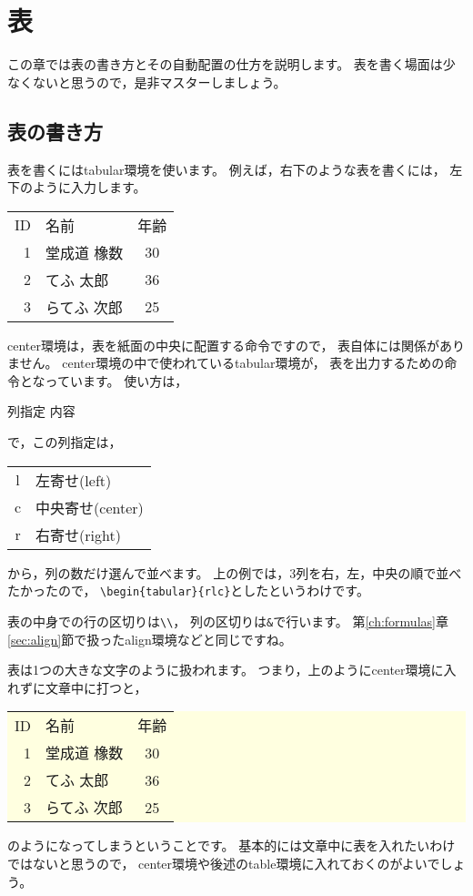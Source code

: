 \documentclass[class=jreport, crop=false, preview=false, dvipdfmx, fleqn]{standalone}
\begin{document}
\chapter{表}
\label{ch:tables}

この章では表の書き方とその自動配置の仕方を説明します。
表を書く場面は少なくないと思うので，是非マスターしましょう。



\section{表の書き方}
表を書くにはtabular環境を使います。
例えば，右下のような表を書くには，
左下のように入力します。

\begin{IOTeX}
\begin{center}
\begin{tabular}{rlc}
ID & 名前 & 年齢 \\
1 & 堂成道 橡数 & 30 \\
2 & てふ 太郎 & 36 \\
3 & らてふ 次郎 & 25
\end{tabular}
\end{center}
\end{IOTeX}

center環境は，表を紙面の中央に配置する命令ですので，
表自体には関係がありません。
center環境の中で使われているtabular環境が，
表を出力するための命令となっています。
使い方は，
\begin{ITeX}
\begin{tabular}{列指定}
内容
\end{tabular}
\end{ITeX}
で，この列指定は，

\begin{tabular}{cl}
l & 左寄せ(left) \\
c & 中央寄せ(center) \\
r & 右寄せ(right)
\end{tabular}

から，列の数だけ選んで並べます。
上の例では，3列を右，左，中央の順で並べたかったので，
\verb|\begin{tabular}{rlc}|としたというわけです。

表の中身での行の区切りは\verb|\\|，
列の区切りは\verb|&|で行います。
第\ref{ch:formulas}章\ref{sec:align}節で扱ったalign環境などと同じですね。

表は1つの大きな文字のように扱われます。
つまり，上のようにcenter環境に入れずに文章中に打つと，
\colorbox{lightyellow}{%
\begin{tabular}{rlc}
ID & 名前 & 年齢 \\
1 & 堂成道 橡数 & 30 \\
2 & てふ 太郎 & 36 \\
3 & らてふ 次郎 & 25
\end{tabular}}
のようになってしまうということです。
基本的には文章中に表を入れたいわけではないと思うので，
center環境や後述のtable環境に入れておくのがよいでしょう。
\end{document}
